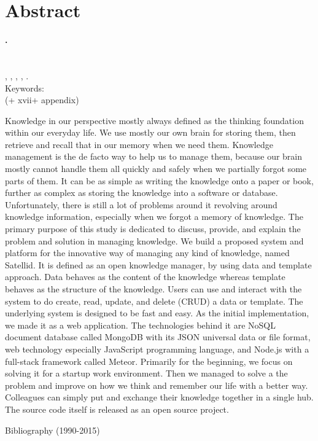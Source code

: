 
\begingroup
\let\clearpage\relax
\let\cleardoublepage\relax

\label{chap:abstract}
\chapter{Abstract}

\textbf{\myName.} \myNPM \\
\textbf{\myTitle} \\
\myDepTitle \\
\myThesisType, \myDepartmentLong, \myFacultyLong, \myUni, \myYear. \\
Keywords: \myKeywords \\
(+ xvii+ appendix)

\hfill

\singlespacing

Knowledge in our perspective mostly always defined as the thinking foundation within our everyday life.
We use mostly our own brain for storing them, then retrieve and recall that in our memory when we need them.
Knowledge management is the de facto way to help us to manage them, because our brain mostly cannot handle them all quickly and safely when we partially forgot some parts of them.
It can be as simple as writing the knowledge onto a paper or book, further as complex as storing the knowledge into a software or database.
Unfortunately, there is still a lot of problems around it revolving around knowledge information, especially when we forgot a memory of knowledge.
The primary purpose of this study is dedicated to discuss, provide, and explain the problem and solution in managing knowledge.
We build a proposed system and platform for the innovative way of managing any kind of knowledge, named Satellid.
It is defined as an open knowledge manager, by using data and template approach.
Data behaves as the content of the knowledge whereas template behaves as the structure of the knowledge.
Users can use and interact with the system to do create, read, update, and delete (CRUD) a data or template.
The underlying system is designed to be fast and easy.
As the initial implementation, we made it as a web application.
The technologies behind it are NoSQL document database called MongoDB with its JSON universal data or file format, web technology especially JavaScript programming language, and Node.js with a full-stack framework called Meteor.
Primarily for the beginning, we focus on solving it for a startup work environment.
Then we managed to solve a the problem and improve on how we think and remember our life with a better way.
Colleagues can simply put and exchange their knowledge together in a single hub.
The source code itself is released as an open source project.

\onehalfspacing

\hfill


\noindent Bibliography (1990-2015)



\endgroup

\vfill
